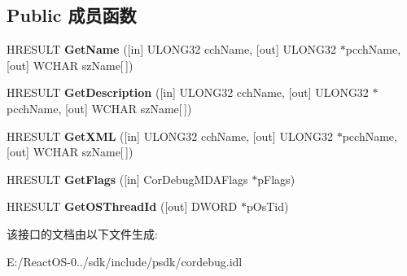 \subsection*{Public 成员函数}
\begin{DoxyCompactItemize}
\item 
\mbox{\label{interface_i_cor_debug_m_d_a_aa6f4886f3ce0d71ff2ec8bbf1a70457f}} 
H\+R\+E\+S\+U\+LT {\bfseries Get\+Name} (\mbox{[}in\mbox{]} U\+L\+O\+N\+G32 cch\+Name, \mbox{[}out\mbox{]} U\+L\+O\+N\+G32 $\ast$pcch\+Name, \mbox{[}out\mbox{]} W\+C\+H\+AR sz\+Name\mbox{[}$\,$\mbox{]})
\item 
\mbox{\label{interface_i_cor_debug_m_d_a_a6001ffa6f999e90b8ce63f8025526f0b}} 
H\+R\+E\+S\+U\+LT {\bfseries Get\+Description} (\mbox{[}in\mbox{]} U\+L\+O\+N\+G32 cch\+Name, \mbox{[}out\mbox{]} U\+L\+O\+N\+G32 $\ast$pcch\+Name, \mbox{[}out\mbox{]} W\+C\+H\+AR sz\+Name\mbox{[}$\,$\mbox{]})
\item 
\mbox{\label{interface_i_cor_debug_m_d_a_a710ee88a93c696761faa659173640b7d}} 
H\+R\+E\+S\+U\+LT {\bfseries Get\+X\+ML} (\mbox{[}in\mbox{]} U\+L\+O\+N\+G32 cch\+Name, \mbox{[}out\mbox{]} U\+L\+O\+N\+G32 $\ast$pcch\+Name, \mbox{[}out\mbox{]} W\+C\+H\+AR sz\+Name\mbox{[}$\,$\mbox{]})
\item 
\mbox{\label{interface_i_cor_debug_m_d_a_a52636baf23d8df84db77c9f35d5da70d}} 
H\+R\+E\+S\+U\+LT {\bfseries Get\+Flags} (\mbox{[}in\mbox{]} Cor\+Debug\+M\+D\+A\+Flags $\ast$p\+Flags)
\item 
\mbox{\label{interface_i_cor_debug_m_d_a_a8699f9847246aab18238fac4d1240de2}} 
H\+R\+E\+S\+U\+LT {\bfseries Get\+O\+S\+Thread\+Id} (\mbox{[}out\mbox{]} D\+W\+O\+RD $\ast$p\+Os\+Tid)
\end{DoxyCompactItemize}


该接口的文档由以下文件生成\+:\begin{DoxyCompactItemize}
\item 
E\+:/\+React\+O\+S-\/0../sdk/include/psdk/cordebug.\+idl\end{DoxyCompactItemize}
